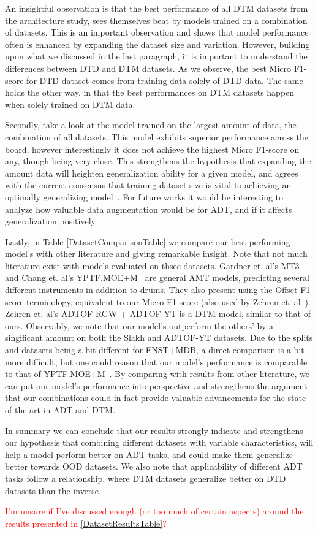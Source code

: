 An insightful observation is that the best performance of all \gls{DTM} datasets from the architecture study, sees themselves beat by models trained on a combination of datasets. This is an important observation and shows that model performance often is enhanced by expanding the dataset size and variation. However, building upon what we discussed in the last paragraph, it is important to understand the differences between \gls{DTD} and \gls{DTM} datasets. As we observe, the best Micro F1-score for \gls{DTD} dataset comes from training data solely of \gls{DTD} data. The same holds the other way, in that the best performances on \gls{DTM} datasets happen when solely trained on \gls{DTM} data.

Secondly, take a look at the model trained on the largest amount of data, the combination of all datasets. This model exhibits superior performance across the board, however interestingly it does not achieve the highest Micro F1-score on any, though being very close. This strengthens the hypothesis that expanding the amount data will heighten generalization ability for a given model, and agrees with the current consensus that training dataset size is vital to achieving an optimally generalizing model~\cite{signals4040042, 9747048}. For future works it would be interesting to analyze how valuable data augmentation would be for \gls{ADT}, and if it affects generalization positively.

Lastly, in Table \ref{DatasetComparisonTable} we compare our best performing model's with other literature and giving remarkable insight. Note that not much literature exist with models evaluated on thsee datasets. Gardner et. al's MT3~\cite{gardner2022mt3multitaskmultitrackmusic} and Chang et. al's YPTF.MOE+M~\cite{chang2024yourmt3+} are general \gls{AMT} models, predicting several different instruments in addition to drums. They also present using the Offset F1-score terminology, equivalent to our Micro F1-score (also used by Zehren et. al~\cite{signals4040042}). Zehren et. al's ADTOF-RGW + ADTOF-YT is a \gls{DTM} model, similar to that of ours. Observably, we note that our model's outperform the others' by a singificant amount on both the Slakh and ADTOF-YT datasets. Due to the splits and datasets being a bit different for ENST+MDB, a direct comparison is a bit more difficult, but one could reason that our model's performance is comparable to that of YPTF.MOE+M~\cite{chang2024yourmt3+}. By comparing with results from other literature, we can put our model's performance into perspective and strengthens the argument that our combinations could in fact provide valuable advancements for the state-of-the-art in \gls{ADT} and \gls{DTM}.

In summary we can conclude that our results strongly indicate and strengthens our hypothesis that combining different datasets with variable characteristics, will help a model perform better on \gls{ADT} tasks, and could make them generalize better towards \acrfull{OOD} datasets. We also note that applicability of different \gls{ADT} tasks follow a relationship, where \gls{DTM} datasets generalize better on \gls{DTD} datasets than the inverse.

\textcolor{red}{I'm unsure if I've discussed enough (or too much of certain aspects) around the results presented in \ref{DatasetResultsTable}?}